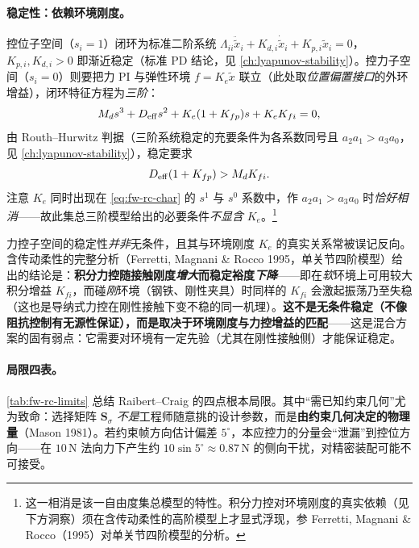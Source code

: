 \paragraph{稳定性：依赖环境刚度。}
控位子空间（$s_i=1$）闭环为标准二阶系统 $\Lambda_{ii}\ddot{\tilde{x}}_i+K_{d,i}\dot{\tilde{x}}_i+K_{p,i}\tilde{x}_i=0$，$K_{p,i},K_{d,i}>0$ 即渐近稳定（标准 PD 结论，见 \cref{ch:lyapunov-stability}）。控力子空间（$s_i=0$）则要把力 PI 与弹性环境 $f=K_e\tilde{x}$ 联立（此处取\emph{位置偏置接口}的外环增益），闭环特征方程为\emph{三阶}：
\begin{equation}
  M_d s^3+D_{\rm eff}s^2+K_e(1+K_{fp})s+K_e K_{fi}=0,
  \label{eq:fw-rc-char}
\end{equation}
由 Routh--Hurwitz 判据（三阶系统稳定的充要条件为各系数同号且 $a_2a_1>a_3a_0$，见 \cref{ch:lyapunov-stability}），稳定要求
\begin{equation}
  D_{\rm eff}(1+K_{fp})>M_d K_{fi}.
  \label{eq:fw-rc-rh}
\end{equation}
注意 $K_e$ 同时出现在 \cref{eq:fw-rc-char} 的 $s^1$ 与 $s^0$ 系数中，作 $a_2a_1>a_3a_0$ 时\emph{恰好相消}——故此集总三阶模型给出的必要条件\emph{不显含} $K_e$。\footnote{这一相消是该一自由度集总模型的特性。积分力控对环境刚度的真实依赖（见下方洞察）须在含传动柔性的高阶模型上才显式浮现，参 Ferretti, Magnani \& Rocco（1995）对单关节四阶模型的分析。}

\begin{insight}
\label{ins:fw-rc-cond}
力控子空间的稳定性\emph{并非}无条件，且其与环境刚度 $K_e$ 的真实关系常被误记反向。含传动柔性的完整分析（Ferretti, Magnani \& Rocco 1995，单关节四阶模型）给出的结论是：\textbf{积分力控随接触刚度\emph{增大}而稳定裕度\emph{下降}}——即在\emph{软}环境上可用较大积分增益 $K_{fi}$，而碰\emph{刚}环境（钢铁、刚性夹具）时同样的 $K_{fi}$ 会激起振荡乃至失稳（这也是导纳式力控在刚性接触下变不稳的同一机理）。\textbf{这不是无条件稳定（不像阻抗控制有无源性保证），而是取决于环境刚度与力控增益的匹配}——这是混合方案的固有弱点：它需要对环境有一定先验（尤其在刚性接触侧）才能保证稳定。
\end{insight}

\paragraph{局限四表。}
\cref{tab:fw-rc-limits} 总结 Raibert--Craig 的四点根本局限。其中“需已知约束几何”尤为致命：选择矩阵 $\mathbf{S}_\sigma$ \emph{不是}工程师随意挑的设计参数，而是\textbf{由约束几何决定的物理量}（Mason 1981\cite{mason1981compliance}）。若约束帧方向估计偏差 $5^\circ$，本应控力的分量会“泄漏”到控位方向——在 $10\,\mathrm{N}$ 法向力下产生约 $10\sin5^\circ\approx0.87\,\mathrm{N}$ 的侧向干扰，对精密装配可能不可接受。

